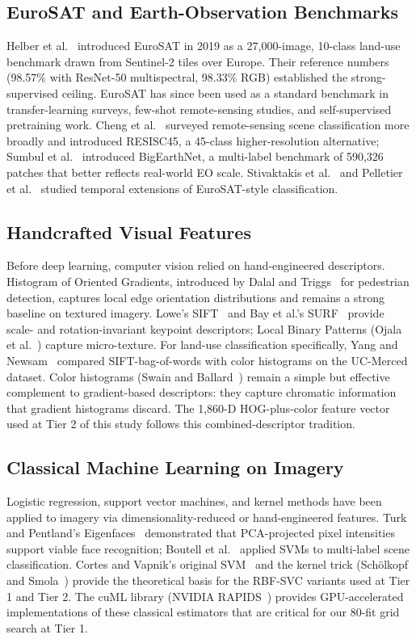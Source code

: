 \documentclass[10pt,letterpaper]{article}
\begin{document}
\subsection{EuroSAT and Earth-Observation Benchmarks}
Helber et al.~\cite{helber2019} introduced EuroSAT in 2019 as a 27{,}000-image, 10-class land-use benchmark drawn from Sentinel-2 tiles over Europe. Their reference numbers (98.57\% with ResNet-50 multispectral, 98.33\% RGB) established the strong-supervised ceiling. EuroSAT has since been used as a standard benchmark in transfer-learning surveys, few-shot remote-sensing studies, and self-supervised pretraining work. Cheng et al.~\cite{cheng2017} surveyed remote-sensing scene classification more broadly and introduced RESISC45, a 45-class higher-resolution alternative; Sumbul et al.~\cite{bigearthnet2019} introduced BigEarthNet, a multi-label benchmark of 590{,}326 patches that better reflects real-world EO scale. Stivaktakis et al.~\cite{stivaktakis2019} and Pelletier et al.~\cite{pelletier2019} studied temporal extensions of EuroSAT-style classification.

\subsection{Handcrafted Visual Features}
Before deep learning, computer vision relied on hand-engineered descriptors. Histogram of Oriented Gradients, introduced by Dalal and Triggs~\cite{dalal2005} for pedestrian detection, captures local edge orientation distributions and remains a strong baseline on textured imagery. Lowe's SIFT~\cite{lowe2004} and Bay et al.'s SURF~\cite{bay2008} provide scale- and rotation-invariant keypoint descriptors; Local Binary Patterns (Ojala et al.~\cite{ojala2002}) capture micro-texture. For land-use classification specifically, Yang and Newsam~\cite{yang2010} compared SIFT-bag-of-words with color histograms on the UC-Merced dataset. Color histograms (Swain and Ballard~\cite{swain1991}) remain a simple but effective complement to gradient-based descriptors: they capture chromatic information that gradient histograms discard. The 1{,}860-D HOG-plus-color feature vector used at Tier 2 of this study follows this combined-descriptor tradition.

\subsection{Classical Machine Learning on Imagery}
Logistic regression, support vector machines, and kernel methods have been applied to imagery via dimensionality-reduced or hand-engineered features. Turk and Pentland's Eigenfaces~\cite{turk1991} demonstrated that PCA-projected pixel intensities support viable face recognition; Boutell et al.~\cite{boutell2004} applied SVMs to multi-label scene classification. Cortes and Vapnik's original SVM~\cite{cortes1995} and the kernel trick (Sch\"{o}lkopf and Smola~\cite{scholkopf2002}) provide the theoretical basis for the RBF-SVC variants used at Tier 1 and Tier 2. The cuML library (NVIDIA RAPIDS~\cite{rapids2018}) provides GPU-accelerated implementations of these classical estimators that are critical for our 80-fit grid search at Tier 1.
\end{document}
